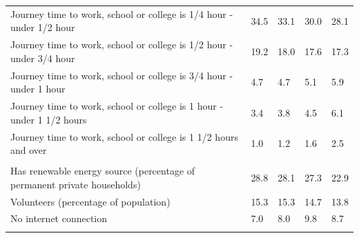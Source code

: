 \documentclass{article}
\begin{document}
\begin{table}[h]
\begin{tabular}{KTTTT}
Journey time to work, school or college is 1/4 hour - under 1/2 hour & 34.5& 33.1& 30.0& 28.1\\
Journey time to work, school or college is 1/2 hour - under 3/4 hour & 19.2& 18.0& 17.6& 17.3\\
Journey time to work, school or college is 3/4 hour - under 1 hour & 4.7& 4.7& 5.1& 5.9\\
Journey time to work, school or college is 1 hour - under 1 1/2 hours & 3.4& 3.8& 4.5& 6.1\\
Journey time to work, school or college is 1 1/2 hours and over & 1.0& 1.2& 1.6& 2.5\\
\hline
    \\ 
    \hline
Has renewable energy source (percentage of permanent private households) & 28.8& 28.1& 27.3& 22.9\\
    \hline
Volunteers (percentage of population) & 15.3& 15.3& 14.7& 13.8\\
    \hline
No internet connection& 7.0& 8.0& 9.8& 8.7\\
\hline
\end{tabular}
\end{table}
\end{document}
